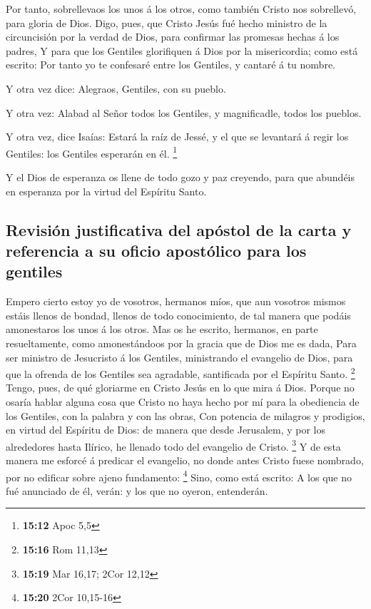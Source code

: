  Por tanto, sobrellevaos los unos á los otros, como
también Cristo nos sobrellevó, para gloria de Dios.  Digo,
pues, que Cristo Jesús fué hecho ministro de la circuncisión por la
verdad de Dios, para confirmar las promesas hechas á los padres,
 Y para que los Gentiles glorifiquen á Dios por la
misericordia; como está escrito: Por tanto yo te confesaré entre los
Gentiles, y cantaré á tu nombre.

 Y otra vez dice: Alegraos, Gentiles, con su pueblo.

 Y otra vez: Alabad al Señor todos los Gentiles, y
magnificadle, todos los pueblos.

 Y otra vez, dice Isaías: Estará la raíz de Jessé, y el
que se levantará á regir los Gentiles: los Gentiles esperarán en él.
\footnote{\textbf{15:12} Apoc 5,5}

 Y el Dios de esperanza os llene de todo gozo y paz
creyendo, para que abundéis en esperanza por la virtud del Espíritu
Santo.

\hypertarget{revisiuxf3n-justificativa-del-apuxf3stol-de-la-carta-y-referencia-a-su-oficio-apostuxf3lico-para-los-gentiles}{%
\subsection{Revisión justificativa del apóstol de la carta y referencia
a su oficio apostólico para los
gentiles}\label{revisiuxf3n-justificativa-del-apuxf3stol-de-la-carta-y-referencia-a-su-oficio-apostuxf3lico-para-los-gentiles}}

 Empero cierto estoy yo de vosotros, hermanos míos, que
aun vosotros mismos estáis llenos de bondad, llenos de todo
conocimiento, de tal manera que podáis amonestaros los unos á los otros.
 Mas os he escrito, hermanos, en parte resueltamente,
como amonestándoos por la gracia que de Dios me es dada, 
Para ser ministro de Jesucristo á los Gentiles, ministrando el evangelio
de Dios, para que la ofrenda de los Gentiles sea agradable, santificada
por el Espíritu Santo. \footnote{\textbf{15:16} Rom 11,13}
 Tengo, pues, de qué gloriarme en Cristo Jesús en lo que
mira á Dios.  Porque no osaría hablar alguna cosa que
Cristo no haya hecho por mí para la obediencia de los Gentiles, con la
palabra y con las obras,  Con potencia de milagros y
prodigios, en virtud del Espíritu de Dios: de manera que desde
Jerusalem, y por los alrededores hasta Ilírico, he llenado todo del
evangelio de Cristo. \footnote{\textbf{15:19} Mar 16,17; 2Cor 12,12}
 Y de esta manera me esforcé á predicar el evangelio, no
donde antes Cristo fuese nombrado, por no edificar sobre ajeno
fundamento: \footnote{\textbf{15:20} 2Cor 10,15-16} 
Sino, como está escrito: A los que no fué anunciado de él, verán: y los
que no oyeron, entenderán.

